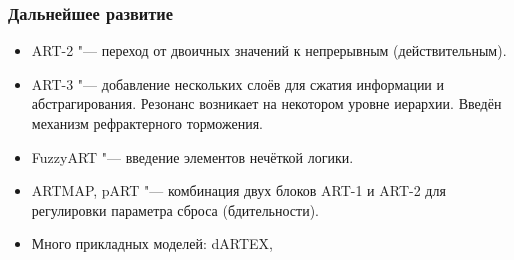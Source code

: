 \documentclass[default]{beamer}
\begin{document}
	\begin{frame}
		\frametitle{Дальнейшее развитие}
		
		\begin{itemize}
			\item ART-2 "--- переход от двоичных значений к непрерывным (действительным).
			\item ART-3 "--- добавление нескольких слоёв для сжатия информации и абстрагирования. Резонанс возникает на некотором уровне иерархии. Введён механизм рефрактерного торможения.
			\item FuzzyART "--- введение элементов нечёткой логики.
			\item ARTMAP, pART "--- комбинация двух блоков ART-1 и ART-2 для регулировки параметра сброса (бдительности).
			\item Много прикладных моделей: dARTEX,
		\end{itemize}
	\end{frame}
	
\end{document}

